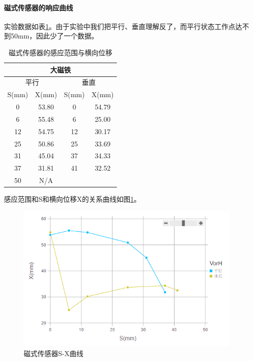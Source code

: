 	\paragraph{磁式传感器的响应曲线}
	实验数据如表\ref{tab:mt}。由于实验中我们把平行、垂直理解反了，而平行状态工作点达不到50mm，因此少了一个数据。
	\begin{table}[htbp]
		\centering
		\begin{tabular}{|cc|cc|}
			\hline
			\multicolumn{4}{|c|}{大磁铁} \\
			\hline
			\multicolumn{2}{|c|}{平行} & \multicolumn{2}{|c|}{垂直} \\
			\hline
			S(mm) & X(mm) & S(mm) & X(mm) \\
			0 & 53.80 & 0 & 54.79 \\
			6 & 55.48 & 6 & 25.00 \\
			12 & 54.75 & 12 & 30.17 \\
			25 & 50.86 & 25 & 33.69 \\
			31 & 45.04 & 37 & 34.33 \\
			37 & 31.81 & 41 & 32.52 \\
			50 & N/A & & \\
			\hline
		\end{tabular}
		\caption{磁式传感器的感应范围与横向位移}
		\label{tab:mt}
	\end{table}

	感应范围和S和横向位移X的关系曲线如图\ref{fig:mr}。
	\begin{figure}[htbp]
	\centering
	\includegraphics[width=11cm]{resource/mr.png}
	\caption{磁式传感器S-X曲线}
	\label{fig:mr}
	\end{figure}

